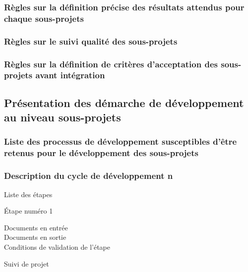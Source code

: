         \subsubsection{Règles sur la définition précise des résultats attendus pour chaque sous-projets}

        \subsubsection{Règles sur le suivi qualité des sous-projets}

        \subsubsection{Règles sur la définition de critères d’acceptation des sous-projets avant intégration}

    \subsection{Présentation des démarche de développement au niveau sous-projets}

        \subsubsection{Liste des processus de développement susceptibles d’être retenus pour le
            développement des sous-projets}

        \subsubsection{Description du cycle de développement n}

            \par{Liste des étapes}

            \par{Étape numéro 1}

            \begin{description}
                \item[Documents en entrée]
                \item[Documents en sortie]
                \item[Conditions de validation de l'étape]
            \end{description}

            \par{Suivi de projet}
\pagebreak
